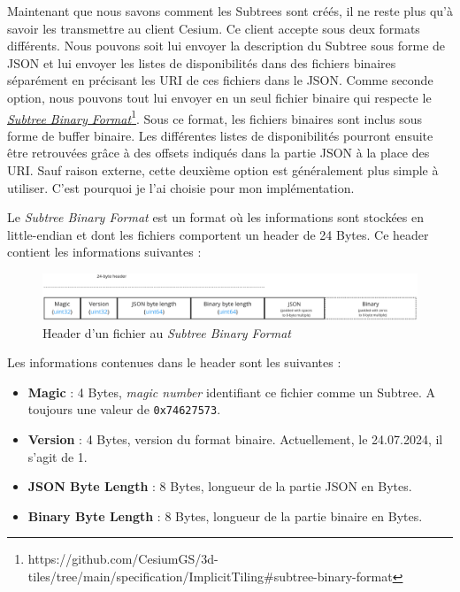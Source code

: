 Maintenant que nous savons comment les Subtrees sont créés, il ne reste plus qu'à savoir les transmettre au client Cesium. Ce client accepte sous deux formats différents. Nous pouvons soit lui envoyer la description du Subtree sous forme de JSON et lui envoyer les listes de disponibilités dans des fichiers binaires séparément en précisant les URI de ces fichiers dans le JSON. Comme seconde option, nous pouvons tout lui envoyer en un seul fichier binaire qui respecte le \href{https://github.com/CesiumGS/3d-tiles/tree/main/specification/ImplicitTiling#subtree-binary-format}{\textit{Subtree Binary Format}}\footnote{https://github.com/CesiumGS/3d-tiles/tree/main/specification/ImplicitTiling\#subtree-binary-format}. Sous ce format, les fichiers binaires sont inclus sous forme de buffer binaire. Les différentes listes de disponibilités pourront ensuite être retrouvées grâce à des offsets indiqués dans la partie JSON à la place des URI. Sauf raison externe, cette deuxième option est généralement plus simple à utiliser. C'est pourquoi je l'ai choisie pour mon implémentation.

Le \textit{Subtree Binary Format} est un format où les informations sont stockées en little-endian et dont les fichiers comportent un header de 24 Bytes. Ce header contient les informations suivantes :

\begin{figure}[H]
    \centering
    \includegraphics[width=1\textwidth]{assets/figures/binary-subtree.png}
    \caption{Header d'un fichier au \textit{Subtree Binary Format} \cite{implicit-tiling-gh}}
    \label{fig:binary-subtree}
\end{figure}

Les informations contenues dans le header sont les suivantes :

\begin{itemize}
    \item \textbf{Magic} : 4 Bytes, \textit{magic number} identifiant ce fichier comme un Subtree. A toujours une valeur de \texttt{0x74627573}.
    \item \textbf{Version} : 4 Bytes, version du format binaire. Actuellement, le 24.07.2024, il s'agit de 1.
    \item \textbf{JSON Byte Length} : 8 Bytes, longueur de la partie JSON en Bytes.
    \item \textbf{Binary Byte Length} : 8 Bytes, longueur de la partie binaire en Bytes.
\end{itemize}

